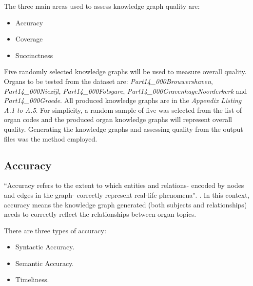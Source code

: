 The three main areas used to assess knowledge graph quality are: 

\vspace{-0.2cm}
\begin{itemize}
    \itemsep0em 
    \item Accuracy
    \vspace{-0.15cm}
    \item Coverage
    \vspace{-0.15cm}
    \item Succinctness
\end{itemize}
\vspace{-0.1cm}

Five randomly selected knowledge graphs will be used to measure overall quality. Organs to be tested from the dataset are: \textit{Part14\_000Brouwershaven}, \textit{Part14\_000Niezijl}, \textit{Part14\_000Folsgare}, \textit{Part14\_000GravenhageNoorderkerk} and \textit{Part14\_000Groede}. All produced knowledge graphs are in the \textit{Appendix Listing A.1 to A.5}. For simplicity, a random sample of five was selected from the list of organ codes and the produced organ knowledge graphs will represent overall quality. Generating the knowledge graphs and assessing quality from the output files was the method employed. 

\subsection{Accuracy}
\hspace{0.5cm} ``Accuracy refers to the extent to which entities and relations- encoded by nodes and edges in the graph- correctly represent real-life phenomena". \cite{knowledgegraphevaulationbook}. In this context, accuracy means the knowledge graph generated (both subjects and relationships) needs to correctly reflect the relationships between organ topics. 

There are three types of accuracy: 

\vspace{-0.2cm}
\begin{itemize}
    \itemsep0em 
\item Syntactic Accuracy.
\vspace{-0.1cm}
\item Semantic Accuracy.
\vspace{-0.1cm}
\item Timeliness.
\end{itemize}
\vspace{-0.4cm}

